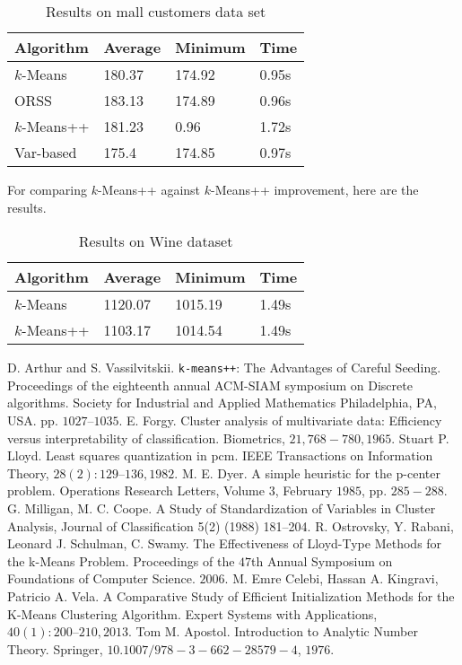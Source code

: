 \documentclass[twoside, 11pt]{article}
\begin{document}
		\begin{table}
			\begin{center}
				\begin{tabular}{|l|l|l|l|}
					\hline
					Algorithm & Average & Minimum & Time\\\hline
					$k$-Means & 180.37& 174.92& 0.95s\\\hline
					ORSS & 183.13& 174.89& 0.96s\\\hline
					$k$-Means++ & 181.23& 0.96& 1.72s\\\hline
					Var-based & 175.4& 174.85& 0.97s\\\hline
				\end{tabular}
				\caption{Results on mall customers data set}
			\end{center}
			\label{tbl:mall}
		\end{table}
	For comparing $k$-Means++ against $k$-Means++ improvement, here are the results.
		\begin{table}
			\begin{center}
				\begin{tabular}{|l|l|l|l|}
					\hline
					Algorithm & Average & Minimum & Time\\\hline
					$k$-Means & 1120.07& 1015.19& 1.49s\\\hline
					$k$-Means++ & 1103.17& 1014.54& 1.49s\\\hline
				\end{tabular}
				\caption{Results on Wine dataset}
			\end{center}
			\label{tbl:wine}
		\end{table}
	\begin{thebibliography}{99}
		 D. Arthur and S. Vassilvitskii. \texttt{k-means++}: The Advantages of Careful Seeding. Proceedings of the eighteenth annual ACM-SIAM symposium on Discrete algorithms. Society for Industrial and Applied Mathematics Philadelphia, PA, USA. pp. $1027–1035$.
		 E. Forgy. Cluster analysis of multivariate data: Efficiency versus interpretability of classification. Biometrics, $21, 768-780, 1965$.
		 Stuart P. Lloyd. Least squares quantization in pcm. IEEE Transactions on Information Theory, $28(2):129–136, 1982$.
		 M. E. Dyer. A simple heuristic for the p-center problem. Operations Research Letters, Volume $3$, February $1985$, pp. $285-288$.
		 G. Milligan, M. C. Coope. A Study of Standardization of Variables in Cluster Analysis, Journal of Classification 5(2) (1988) 181–204.
		 R. Ostrovsky, Y. Rabani, Leonard J. Schulman, C. Swamy. The Effectiveness of Lloyd-Type Methods for the k-Means Problem. Proceedings of the $47$th Annual Symposium on Foundations of Computer Science. $2006$.
		 M. Emre Celebi, Hassan A. Kingravi, Patricio A. Vela. A Comparative Study of Efficient Initialization Methods for the K-Means Clustering Algorithm. Expert Systems with Applications, $40(1): 200–210, 2013$.
		 Tom M. Apostol. Introduction to Analytic Number Theory. Springer, $10.1007/978-3-662-28579-4$, $1976$.
	\end{thebibliography}
\end{document}

